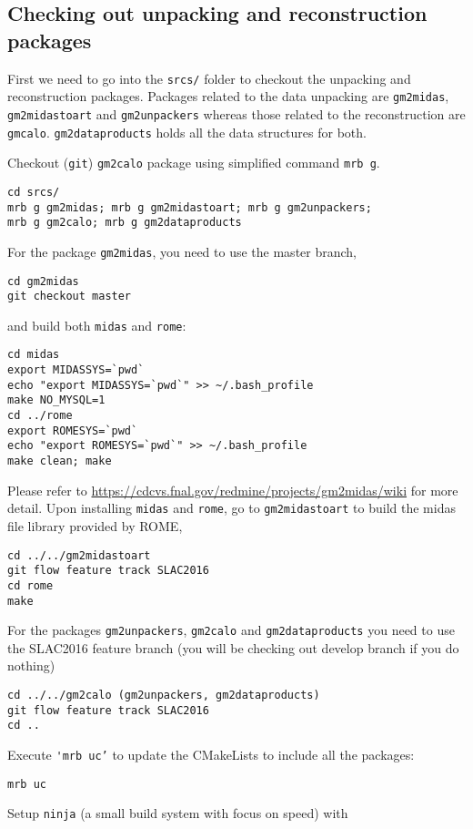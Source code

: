 \subsection{Checking out unpacking and reconstruction packages}
\label{checkingoutunpackingandreconstructionpackages}
First we need to go into the \verb+srcs/+ folder to checkout the unpacking and reconstruction packages. 
Packages related to the data unpacking are \verb+gm2midas+, \verb+gm2midastoart+ and \verb+gm2unpackers+ whereas those related to the reconstruction are
\verb+gmcalo+. \verb+gm2dataproducts+ holds all the data structures for both.

Checkout (\verb+git+) \verb+gm2calo+ package using simplified command \verb+mrb g+.
%
\begin{Verbatim}[frame=single]
cd srcs/
mrb g gm2midas; mrb g gm2midastoart; mrb g gm2unpackers;
mrb g gm2calo; mrb g gm2dataproducts
\end{Verbatim}
%
For the package \verb+gm2midas+, you need to use the master branch,
%
\begin{Verbatim}[frame=single]
cd gm2midas
git checkout master
\end{Verbatim}
%
and build both \verb+midas+ and \verb+rome+:
%
\begin{Verbatim}[frame=single]
cd midas
export MIDASSYS=`pwd`
echo "export MIDASSYS=`pwd`" >> ~/.bash_profile
make NO_MYSQL=1
cd ../rome
export ROMESYS=`pwd`
echo "export ROMESYS=`pwd`" >> ~/.bash_profile
make clean; make
\end{Verbatim}
%
Please refer to \url{https://cdcvs.fnal.gov/redmine/projects/gm2midas/wiki} for more detail.
Upon installing \verb+midas+ and \verb+rome+, go to \verb+gm2midastoart+ to build the midas file library provided by ROME,
%
\begin{Verbatim}[frame=single]
cd ../../gm2midastoart
git flow feature track SLAC2016
cd rome
make
\end{Verbatim}
%
For the packages \verb+gm2unpackers+, \verb+gm2calo+ and \verb+gm2dataproducts+
you need to use the SLAC2016 feature branch (you will be checking out develop branch if you do nothing)
%
\begin{Verbatim}[frame=single]
cd ../../gm2calo (gm2unpackers, gm2dataproducts)
git flow feature track SLAC2016
cd ..
\end{Verbatim}
%
Execute \verb+'mrb uc’+ to update the CMakeLists to include all the packages:
%
\begin{Verbatim}[frame=single]
mrb uc
\end{Verbatim}
%
Setup \verb+ninja+ (a small build system with focus on speed) with
